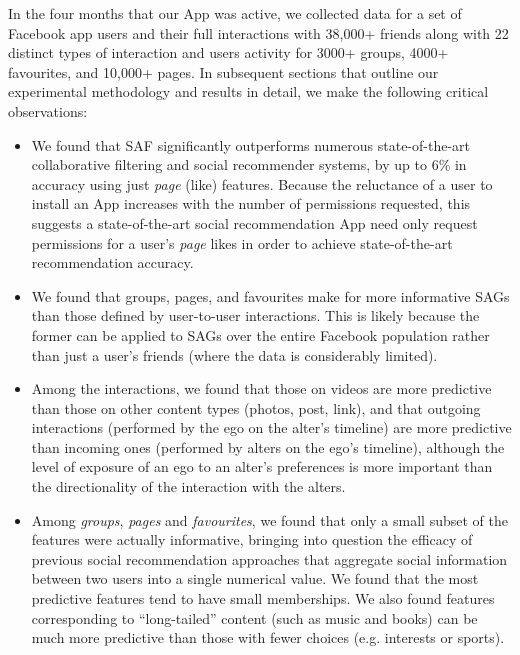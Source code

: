 In the four months that our App was active, we collected data for a
set of Facebook app users and their full interactions with 38,000+
friends along with 22 distinct types of interaction and users activity
for 3000+ groups, 4000+ favourites, and 10,000+ pages.  In subsequent
sections that outline our experimental methodology and results in
detail, we make the following critical observations:
\begin{itemize}
\item We found that SAF significantly 
outperforms numerous state-of-the-art collaborative filtering and social recommender 
systems, by up to 6\% in accuracy using just \emph{page} (like) features.
Because the reluctance of a user to install an App increases with the number
of permissions requested, this suggests a state-of-the-art social recommendation App 
need only request permissions for a user's \emph{page} likes in order to achieve
state-of-the-art recommendation accuracy.
\item We found that groups, pages, and favourites make for more informative
SAGs than those defined by user-to-user interactions.  This is likely because the former can be
applied to SAGs over the entire Facebook population 
rather than just a user's friends (where the data is considerably limited).
\item Among the interactions, we found that those on videos are more predictive than those on other content types (photos, post, link), and that outgoing interactions (performed by the ego on the alter's timeline) 
are more predictive than incoming ones (performed by alters on the
ego's timeline), although the level of exposure of an ego to an
alter's preferences is more important than the directionality of the
interaction with the alters.
\item %
Among {\em groups}, {\em pages} and {\em favourites}, we found that only
a small subset of the features were actually informative, bringing into question the efficacy of 
previous social recommendation approaches that aggregate social information between
two users into a single numerical value.  We found that the most  
predictive features tend to have small memberships.  We also found features
corresponding to ``long-tailed'' content (such as music and books)
can be much more predictive than those with fewer choices 
(e.g. interests or sports). 
\end{itemize}
